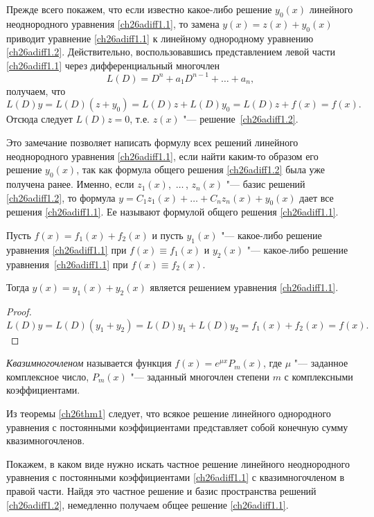 Прежде всего покажем, что если известно какое-либо решение $y_0(x)$ линейного неоднородного уравнения \eqref{ch26adiff1.1}, то замена $y(x)=z(x)+y_0(x)$ приводит уравнение \eqref{ch26adiff1.1} к линейному однородному уравнению \eqref{ch26adiff1.2}. Действительно, воспользовавшись представлением левой части \eqref{ch26adiff1.1} через дифференциальный многочлен
\begin{equation}\label{ch26adiff1.3}
L(D)=D^n+a_1D^{n-1}+\dots+a_n,
\end{equation}
получаем, что
$$
L(D)y=L(D)(z+y_0)=L(D)z+L(D)y_0=L(D)z+f(x)=f(x).
$$
Отсюда следует $L(D)z=0$, т.е. $z(x)$ "--- решение~\eqref{ch26adiff1.2}.

Это замечание позволяет написать формулу всех решений линейного неоднородного уравнения \eqref{ch26adiff1.1}, если найти каким-то образом его решение $y_0(x)$, так как формула общего решения \eqref{ch26adiff1.2} была уже получена ранее. Именно, если $z_1(x)$,~$\dots\,$, $z_n(x)$ "--- базис решений \eqref{ch26adiff1.2}, то формула $y=C_1z_1(x)+\dots+C_nz_n(x)+y_0(x)$ дает все решения \eqref{ch26adiff1.1}. Ее называют формулой общего решения \eqref{ch26adiff1.1}.

\begin{lemm}
Пусть $f(x)=f_1(x)+f_2(x)$ и пусть $y_1(x)$ "--- какое-либо решение уравнения \eqref{ch26adiff1.1} при $f(x)\equiv f_1(x)$ и $y_2(x)$ "--- какое-либо решение уравнения~\eqref{ch26adiff1.1} при $f(x) \equiv f_2(x)$.

Тогда $y(x)=y_1(x)+y_2(x)$ является решением уравнения \eqref{ch26adiff1.1}.
\end{lemm}

\begin{proof}
\begin{equation*}
L(D)y=L(D)(y_1+y_2)=L(D)y_1+L(D)y_2=f_1(x)+f_2(x)=f(x).\tag*{\qedhere}
\end{equation*}
\end{proof}

\begin{defn}
\textit{Квазимногочленом} называется функция $f(x)=e^{\mu x}P_m(x)$, где $\mu$ "--- заданное комплексное число, $P_m(x)$ "--- заданный многочлен степени $m$ с комплексными коэффициентами.
\end{defn}

Из теоремы \ref{ch26thm1} следует, что всякое решение линейного однородного уравнения с постоянными коэффициентами представляет собой конечную сумму квазимногочленов.

Покажем, в каком виде нужно искать частное решение линейного неоднородного уравнения с постоянными коэффициентами \eqref{ch26adiff1.1} с квазимногочленом в правой части. Найдя это частное решение и базис пространства решений \eqref{ch26adiff1.2}, немедленно получаем общее решение \eqref{ch26adiff1.1}.

